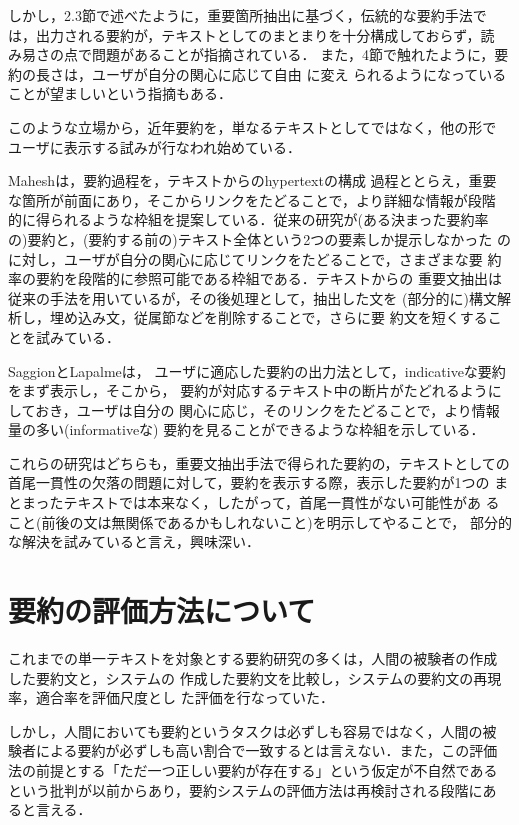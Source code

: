 しかし，2.3節で述べたように，重要箇所抽出に基づく，伝統的な要約手法で
は，出力される要約が，テキストとしてのまとまりを十分構成しておらず，読
み易さの点で問題があることが指摘されている．
また，4節で触れたように，要約の長さは，ユーザが自分の関心に応じて自由
に変え
られるようになっていることが望ましいという指摘もある．

このような立場から，近年要約を，単なるテキストとしてではなく，他の形で
ユーザに表示する試みが行なわれ始めている．

Mahesh\cite{mahesh:97:a}は，要約過程を，テキストからのhypertextの構成
過程ととらえ，重要
な箇所が前面にあり，そこからリンクをたどることで，より詳細な情報が段階
的に得られるような枠組を提案している．従来の研究が(ある決まった要約率
の)要約と，(要約する前の)テキスト全体という2つの要素しか提示しなかった
のに対し，ユーザが自分の関心に応じてリンクをたどることで，さまざまな要
約率の要約を段階的に参照可能である枠組である．テキストからの
重要文抽出は従来の手法を用いているが，その後処理として，抽出した文を
(部分的に)構文解析し，埋め込み文，従属節などを削除することで，さらに要
約文を短くすることを試みている．

SaggionとLapalme\cite{saggion:98:a}は，
ユーザに適応した要約の出力法として，indicativeな要約をまず表示し，そこから，
要約が対応するテキスト中の断片がたどれるようにしておき，ユーザは自分の
関心に応じ，そのリンクをたどることで，より情報量の多い(informativeな)
要約を見ることができるような枠組を示している．

これらの研究はどちらも，重要文抽出手法で得られた要約の，テキストとしての
首尾一貫性の欠落の問題に対して，要約を表示する際，表示した要約が1つの
まとまったテキストでは本来なく，したがって，首尾一貫性がない可能性があ
ること(前後の文は無関係であるかもしれないこと)を明示してやることで，
部分的な解決を試みていると言え，興味深い．

\section{要約の評価方法について}

これまでの単一テキストを対象とする要約研究の多くは，人間の被験者の作成
した要約文と，システムの
作成した要約文を比較し，システムの要約文の再現率，適合率を評価尺度とし
た評価を行なっていた．

しかし，人間においても要約というタスクは必ずしも容易ではなく，人間の被
験者による要約が必ずしも高い割合で一致するとは言えない．また，この評価
法の前提とする「ただ一つ正しい要約が存在する」という仮定が不自然である
という批判が以前からあり，要約システムの評価方法は再検討される段階にあ
ると言える．

